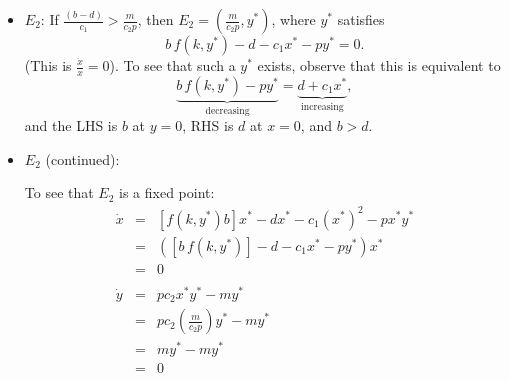 \documentclass{beamer}
\begin{document}
\begin{frame}


\begin{itemize}
\item $E_2$: If  $\frac{(b-d)}{c_1}>\frac{m}{c_2p}$, then $E_2=\left(\frac{m}{c_2p}, y^*\right)$, where $y^*$ satisfies 
$$b\, f(k,y^*)-d-c_1x^*-py^*=0.$$
(This is $\frac{\dot{x}}{x}=0$). To see that such a $y^*$ exists, observe that this is equivalent to
$$\underbrace{b\, f(k,y^*)-py^*}_{\text{decreasing}}=\underbrace{d+c_1x^*}_{\text{increasing}},$$
and the LHS is $b$ at $y=0$, RHS is $d$ at $x=0$, and $b>d$. 
\end{itemize}
\end{frame}
\begin{frame}
\begin{itemize}
\item $E_2$ (continued): 

\mbox{}

To see that $E_2$ is a fixed point: 
\[\begin{array}{rcl}
\dot{x}&=&[f(k,y^*)b]x^*-dx^*-c_1(x^*)^2-px^*y^*\\
&=&([b\,f(k,y^*)]-d-c_1x^*-py^*)x^*\\
&=&0\\
\\
\dot{y}&=&pc_2x^*y^*-my^*\\
&=&pc_2\left(\frac{m}{c_2p}\right)y^*-my^*\\
&=&my^*-my^*\\
&=&0
\end{array}\]
\end{itemize}
\end{frame}
\end{document}
